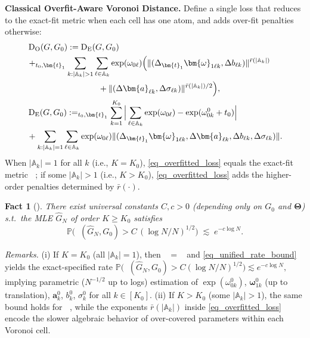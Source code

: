 \documentclass[twoside]{article}
\DeclareMathOperator*{\VDO}{D_{O}}
\DeclareMathOperator*{\VDE}{D_{E}}
\let\inf\relax
\DeclareMathOperator*\inf{\vphantom{p}inf}
\theoremstyle{plain}
\newtheorem{fact}{Fact}
\theoremstyle{definition}
\theoremstyle{plain}
\def\vTheta{{\bm{\Theta}}}
\def\vomega{{\bm{\omega}}}
\def\va{{\bm{a}}}
\def\vt{{\bm{t}}}
\def\sA{{\mathbb{A}}}
\def\st{s.t.~}
\begin{document}
{\bf Classical Overfit-Aware Voronoi Distance.}
Define a single loss that reduces to the exact-fit metric when each cell has one atom, and adds over-fit penalties otherwise:
\begin{align}
    &\VDO(G, G_{0}) : = \VDE(G, G_{0}) \nonumber\\
    &+ \inf_{t_{0}, \vt_{1}}\sum_{k: |\sA_{k}| > 1} \sum_{\ell \in \sA_{k}} \exp(\omega_{0\ell}) \Big(\|(\Delta_{\vt_{1}} \vomega_{1\ell k},  \Delta b_{\ell k})\|^{\bar{r}(|\sA_{k}|)} \nonumber \\
    &\hspace{3cm}+ \|(\Delta \va_{\ell k},\Delta \sigma_{\ell k})\|^{\bar{r}(|\sA_{k}|)/2}\Big),\label{eq_overfitted_loss}\\
    &\VDE(G, G_{0}) : = \inf_{t_{0}, \vt_{1}} \sum_{k = 1}^{K_{0}} \Big|\sum_{\ell \in \sA_{k}} \exp(\omega_{0\ell}) - \exp(\omega_{0k}^{0} + t_{0})\Big| \nonumber \\
    &+ \sum_{k: |\sA_{k}| = 1} \sum_{\ell \in \sA_{k}} \exp(\omega_{0\ell}) \|(\Delta_{\vt_{1}} \vomega_{1\ell k}, \Delta \va_{\ell k},  \Delta b_{\ell k}, \Delta \sigma_{\ell k})\|.\nonumber
\end{align}
When $|\sA_k|=1$ for all $k$ (i.e., $K=K_0$), \cref{eq_overfitted_loss} equals the exact-fit metric $\VDE$; if some $|\sA_k|>1$ (i.e., $K>K_0$), \cref{eq_overfitted_loss} adds the higher-order penalties determined by $\bar r(\cdot)$.

\begin{fact}[{\citealp[Theorems 1 and 2]{nguyen_demystifying_2023}}]\label{thm:unified_rate}There exist universal constants $C,c>0$ (depending only on $G_0$ and $\vTheta$) \st the MLE $\widehat G_N$ of order $K\ge K_0$ satisfies
\begin{equation}\label{eq_unified_rate_bound}
\mathbb{P}\!\Big(\VDO(\widehat G_N,G_0)>C\,(\log N/N)^{1/2}\Big)\;\lesssim\;e^{-c\log N}.
\end{equation}
\end{fact}

\emph{Remarks.} 
(i) If $K=K_0$ (all $|\sA_k|=1$), then $\VDO=\VDE$ and \cref{eq_unified_rate_bound} yields the exact-specified rate
\(
\mathbb{P}\!\big(\VDE(\widehat G_N,G_0)>C(\log N/N)^{1/2}\big)\lesssim e^{-c\log N},
\)
implying parametric ($N^{-1/2}$ up to logs) estimation of
$\exp(\omega^0_{0k})$, $\vomega^0_{1k}$ (up to translation), $\va^0_k$, $b^0_k$, $\sigma^0_k$ for all $k\in[K_0]$.
(ii) If $K>K_0$ (some $|\sA_k|>1$), the same bound holds for $\VDO$, while the exponents $\bar r(|\sA_k|)$ inside \cref{eq_overfitted_loss} encode the slower algebraic behavior of over-covered parameters within each Voronoi cell.
\end{document}
